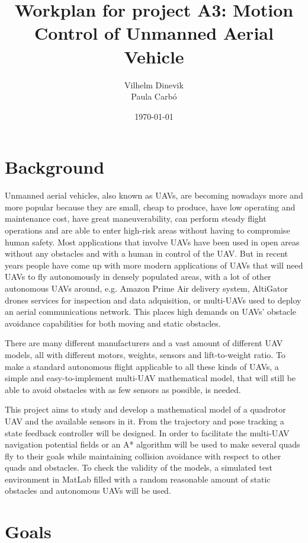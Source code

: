 \documentclass{article}
\title{Workplan for project A3: Motion Control of Unmanned Aerial Vehicle}
\author{Vilhelm Dinevik \\ Paula Carbó}
\date{\today}
\begin{document}
	\maketitle
	
	\bigskip
	\section{Background}
		Unmanned aerial vehicles, also known as UAVs, are becoming nowadays more and more popular because they are small, cheap to produce, have low operating and maintenance cost, have great maneuverability, can perform steady flight operations and are able to enter high-risk areas without having to compromise human safety. Most applications that involve UAVs have been used in open areas without any obstacles and with a human in control of the UAV. But in recent years people have come up with more modern applications of UAVs that will need UAVs to fly autonomously in densely populated areas, with a lot of other autonomous UAVs around, e.g. Amazon Prime Air delivery system, AltiGator drones services for inspection and data adquisition, or multi-UAVs used to deploy an aerial communications network. This places high demands on UAVs’ obstacle avoidance capabilities for both moving and static obstacles.
		
		\vspace{1em}
		There are many different manufacturers and a vast amount of different UAV models, all with different motors, weights, sensors and lift-to-weight ratio. To make a standard autonomous flight applicable to all these kinds of UAVs, a simple and easy-to-implement multi-UAV mathematical model, that will still be able to avoid obstacles with as few sensors as possible, is needed.  
		
		\vspace{1em}
		This project aims to study and develop a mathematical model of a quadrotor UAV and the available sensors in it.  From the trajectory and pose tracking a state feedback controller will be designed. In order to facilitate the multi-UAV navigation potential fields or an A* algorithm will be used to make several quads fly to their goals while maintaining collision avoidance with respect to other quads and obstacles. To check the validity of the models, a simulated test environment in MatLab filled with a random reasonable amount of static obstacles and autonomous UAVs will be used.



	\section{Goals}		 %
\end{document}
